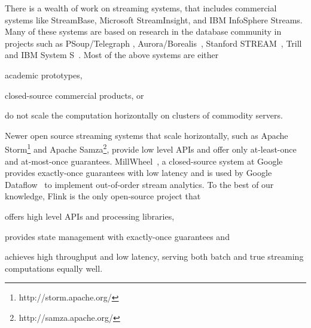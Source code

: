  There is a wealth of work on streaming systems, that includes commercial systems like StreamBase, Microsoft StreamInsight, and IBM InfoSphere Streams. Many of these systems are based on research in the database community in projects such as PSoup/Telegraph \cite{chandrasekaran2003psoup}, Aurora/Borealis~\cite{abadi2005design}, Stanford STREAM~\cite{arasu2004stream}, Trill~\cite{chandramouli2014trill} and IBM System S~\cite{gedik2008spade}. Most of the above systems are either
\begin{inparaenum}[i)]
  \item academic prototypes,
  \item closed-source commercial products, or 
  \item do not scale the computation horizontally on clusters of commodity servers.
\end{inparaenum}
Newer open source streaming systems that scale horizontally, such as Apache Storm\footnote{http://storm.apache.org/} and Apache Samza\footnote{http://samza.apache.org/}, provide low level APIs and offer only at-least-once and at-most-once guarantees. MillWheel~\cite{akidau2013millwheel}, a closed-source system at Google provides exactly-once guarantees with low latency and is used by Google Dataflow~\cite{akidau2015dataflow} to implement  out-of-order stream analytics. To the best of our knowledge, Flink is the only open-source project that
\begin{inparaenum}[i)]
  \item offers high level APIs and processing libraries,
  \item provides state management with exactly-once guarantees and
  \item achieves high throughput and low latency, serving both batch and true streaming computations equally well.
\end{inparaenum}